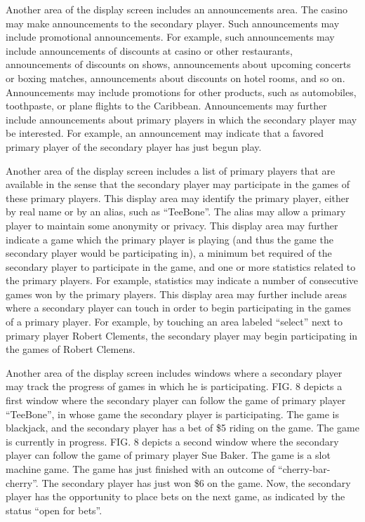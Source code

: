 \documentclass[11pt,a4paper]{article}
\begin{document}
Another area of the display screen includes an announcements area. The casino may make announcements to the secondary player. Such announcements may include promotional announcements. For example, such announcements may include announcements of discounts at casino or other restaurants, announcements of discounts on shows, announcements about upcoming concerts or boxing matches, announcements about discounts on hotel rooms, and so on. Announcements may include promotions for other products, such as automobiles, toothpaste, or plane flights to the Caribbean. Announcements may further include announcements about primary players in which the secondary player may be interested. For example, an announcement may indicate that a favored primary player of the secondary player has just begun play.

Another area of the display screen includes a list of primary players that are available in the sense that the secondary player may participate in the games of these primary players. This display area may identify the primary player, either by real name or by an alias, such as “TeeBone”. The alias may allow a primary player to maintain some anonymity or privacy. This display area may further indicate a game which the primary player is playing (and thus the game the secondary player would be participating in), a minimum bet required of the secondary player to participate in the game, and one or more statistics related to the primary players. For example, statistics may indicate a number of consecutive games won by the primary players. This display area may further include areas where a secondary player can touch in order to begin participating in the games of a primary player. For example, by touching an area labeled “select” next to primary player Robert Clements, the secondary player may begin participating in the games of Robert Clemens.

Another area of the display screen includes windows where a secondary player may track the progress of games in which he is participating. FIG. 8 depicts a first window where the secondary player can follow the game of primary player “TeeBone”, in whose game the secondary player is participating. The game is blackjack, and the secondary player has a bet of \$5 riding on the game. The game is currently in progress. FIG. 8 depicts a second window where the secondary player can follow the game of primary player Sue Baker. The game is a slot machine game. The game has just finished with an outcome of “cherry-bar-cherry”. The secondary player has just won \$6 on the game. Now, the secondary player has the opportunity to place bets on the next game, as indicated by the status “open for bets”.
\end{document}
